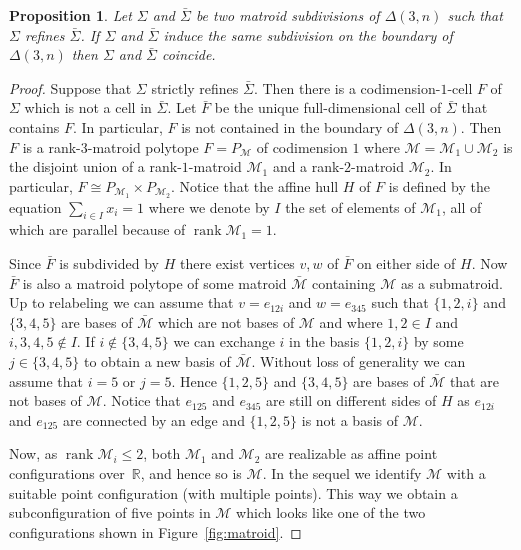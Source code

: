 \documentclass[12pt,a4paper]{amsart}
\newtheorem{prop}[thm]{Proposition}
\theoremstyle{definition}
\newcommand{\R}{{\mathbb{R}}}
\providecommand\cM{{\mathscr{M}}}
\providecommand{\MatroidPolytope}[1]{P_{#1}}
\DeclareMathOperator{\rank}{rank}
\begin{document}
\begin{prop}\label{prop:bar_sigma}
  Let $\Sigma$ and $\bar \Sigma$ be two matroid subdivisions of
  $\Delta(3,n)$ such that $\Sigma$ refines $\bar\Sigma$.  If $\Sigma$
  and $\bar\Sigma$ induce the same subdivision on the boundary of
  $\Delta(3,n)$ then $\Sigma$ and $\bar\Sigma$ coincide.
\end{prop}

\begin{proof}
  Suppose that $\Sigma$ strictly refines $\bar\Sigma$.  Then there is
  a codimension-$1$-cell $F$ of $\Sigma$ which is not a cell in
  $\bar\Sigma$.  Let $\bar F$ be the unique full-dimensional cell of
  $\bar \Sigma$ that contains $F$.  In particular, $F$ is not
  contained in the boundary of $\Delta(3,n)$.  Then $F$ is a
  rank-$3$-matroid polytope $F=\MatroidPolytope{\cM}$ of codimension
  $1$ where $\cM=\cM_1\cup\cM_2$ is the disjoint union of a
  rank-$1$-matroid $\cM_1$ and a rank-$2$-matroid $\cM_2$.  In
  particular,
  $F\cong\MatroidPolytope{\cM_1}\times\MatroidPolytope{\cM_2}$.
  Notice that the affine hull $H$ of $F$ is defined by the equation
  $\sum_{i\in I} x_i=1$ where we denote by $I$ the set of elements of
  $\cM_1$, all of which are parallel because of $\rank\cM_1=1$.

  Since $\bar F$ is subdivided by $H$ there exist vertices $v,w$ of
  $\bar F$ on either side of $H$.  Now $\bar F$ is also a matroid
  polytope of some matroid $\bar\cM$ containing $\cM$ as a submatroid.
  Up to relabeling we can assume that $v=e_{12i}$ and $w=e_{345}$ such
  that $\{1,2,i\}$ and $\{3,4,5\}$ are bases of $\bar\cM$ which are
  not bases of $\cM$ and where $1,2\in I$ and $i,3,4,5\not \in I$.  If
  $i\notin\{3,4,5\}$ we can exchange $i$ in the basis $\{1,2,i\}$ by
  some $j\in\{3,4,5\}$ to obtain a new basis of $\bar\cM$.  Without
  loss of generality we can assume that $i=5$ or $j=5$.  Hence
  $\{1,2,5\}$ and $\{3,4,5\}$ are bases of $\bar\cM$ that are not
  bases of $\cM$.  Notice that $e_{125}$ and $e_{345}$ are still on
  different sides of $H$ as $e_{12i}$ and $e_{125}$ are connected by
  an edge and $\{1,2,5\}$ is not a basis of $\cM$.
  
  Now, as $\rank\cM_i \le 2$, both $\cM_1$ and $\cM_2$ are realizable
  as affine point configurations over~$\R$, and hence so is $\cM$.  In
  the sequel we identify $\cM$ with a suitable point configuration
  (with multiple points).  This way we obtain a subconfiguration of
  five points in $\cM$ which looks like one of the two configurations
  shown in Figure~\ref{fig:matroid}.
  

\end{proof}
\end{document}
